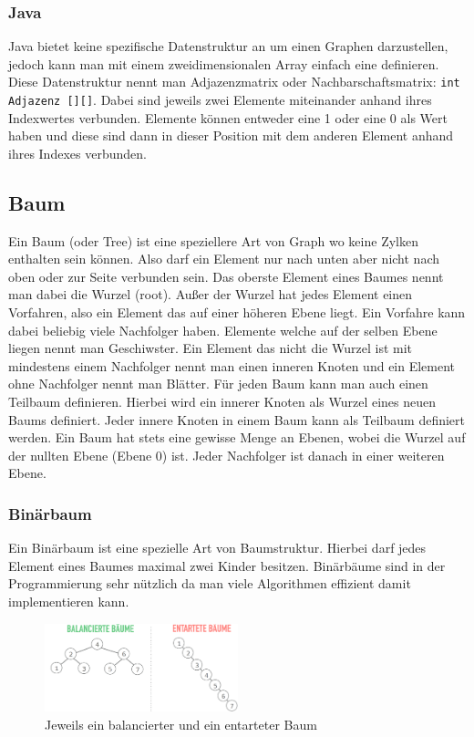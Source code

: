 \documentclass{article}
\begin{document}
	\subsubsection{Java}
	Java bietet keine spezifische Datenstruktur an um einen Graphen darzustellen, jedoch kann man mit einem zweidimensionalen Array einfach eine definieren. Diese Datenstruktur nennt man Adjazenzmatrix oder Nachbarschaftsmatrix: \texttt{int Adjazenz [][]}. Dabei sind jeweils zwei Elemente miteinander anhand ihres Indexwertes verbunden. Elemente können entweder eine 1 oder eine 0 als Wert haben und diese sind dann in dieser Position mit dem anderen Element anhand ihres Indexes verbunden.
	\subsection{Baum}
	Ein Baum (oder Tree) ist eine speziellere Art von Graph wo keine Zylken enthalten sein können. Also darf ein Element nur nach unten aber nicht nach oben oder zur Seite verbunden sein. Das oberste Element eines Baumes nennt man dabei die Wurzel (root). Außer der Wurzel hat jedes Element einen Vorfahren, also ein Element das auf einer höheren Ebene liegt. Ein Vorfahre kann dabei beliebig viele Nachfolger haben. Elemente welche auf der selben Ebene liegen nennt man Geschiwster. Ein Element das nicht die Wurzel ist mit mindestens einem Nachfolger nennt man einen inneren Knoten und ein Element ohne Nachfolger nennt man Blätter. Für jeden Baum kann man auch einen Teilbaum definieren. Hierbei wird ein innerer Knoten als Wurzel eines neuen Baums definiert. Jeder innere Knoten in einem Baum kann als Teilbaum definiert werden. Ein Baum hat stets eine gewisse Menge an Ebenen, wobei die Wurzel auf der nullten Ebene (Ebene 0) ist. Jeder Nachfolger ist danach in einer weiteren Ebene.
	\subsubsection{Binärbaum}
	Ein Binärbaum ist eine spezielle Art von Baumstruktur. Hierbei darf jedes Element eines Baumes maximal zwei Kinder besitzen. Binärbäume sind in der Programmierung sehr nützlich da man viele Algorithmen effizient damit implementieren kann.
	\begin{figure}
	\includegraphics[width=0.5\textwidth]{Bilder/balanced.png}
	\caption{Jeweils ein balancierter und ein entarteter Baum}
	\end{figure}
\end{document}
